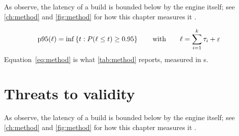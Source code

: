 As \textcite{tectonic2024} observe, the latency \latency{} of a build is
bounded below by the engine itself; see \cref{ch:method} and \cref{fig:method}
for how this chapter measures it \parencite{kleppmann2019}.

\begin{equation}\label{eq:method}
  \operatorname{p95}(\ell) = \inf\left\{ t : P(\ell \le t) \ge 0.95 \right\}
  \qquad \text{with} \qquad \ell = \sum_{i=1}^{k} \tau_i + \varepsilon
\end{equation}
Equation~\eqref{eq:method} is what \cref{tab:method} reports, measured in \si{\second}.

\section{Threats to validity}\label{sec:method-3}
\lipsum[19-32]

As \textcite{kleppmann2019} observe, the latency \latency{} of a build is
bounded below by the engine itself; see \cref{ch:method} and \cref{fig:method}
for how this chapter measures it \parencite{lamport1994}.

